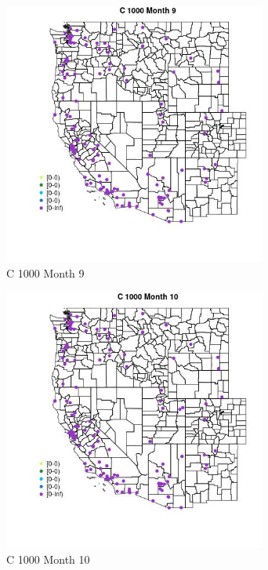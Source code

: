 \begin{figure} 
\centering  
\includegraphics[width=0.77\textwidth]{Code_Outputs/Report_ML_input_PM25_Step4_part_e_de_duplicated_aves_MapObsMo9C_1000.jpg} 
\caption{\label{fig:Report_ML_input_PM25_Step4_part_e_de_duplicated_avesMapObsMo9C_1000}C 1000 Month 9} 
\end{figure} 
 

\begin{figure} 
\centering  
\includegraphics[width=0.77\textwidth]{Code_Outputs/Report_ML_input_PM25_Step4_part_e_de_duplicated_aves_MapObsMo10C_1000.jpg} 
\caption{\label{fig:Report_ML_input_PM25_Step4_part_e_de_duplicated_avesMapObsMo10C_1000}C 1000 Month 10} 
\end{figure} 
 

